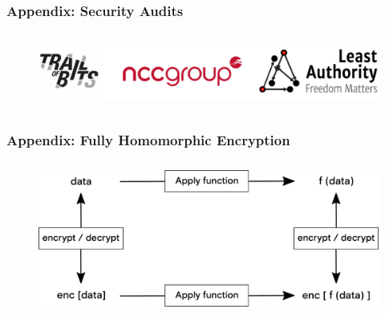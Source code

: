 \documentclass[xetex,mathsans,sans,aspectratio=169]{beamer}
\begin{document}
    \begin{frame}
        \frametitle{Appendix: Security Audits}
        \begin{figure}
            \centering
            \includegraphics[height=2.5cm]{pdf/security-audits.pdf}
      \end{figure}
    \end{frame}

    \begin{frame}
      \frametitle{Appendix: Fully Homomorphic Encryption}
      \begin{figure}
        \centering
        \includegraphics[height=5cm]{pdf/fhe.pdf}
      \end{figure}
    \end{frame}
\end{document}
